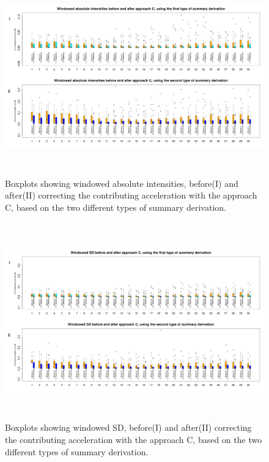 \documentclass{article}
\begin{document}
{\begin{figure}[h!]
\includegraphics[width=15cm, height=8.5cm]{result_approach_C_AI_boxplot.png}
\caption{Boxplots showing windowed absolute intensities, before(I) and after(II) correcting the contributing acceleration with the approach C, based on the two different types of summary derivation.}
\end{figure}
\newpage
\begin{figure}[h!]
\includegraphics[width=15cm, height=8.5cm]{result_approach_C_SD_boxplot.png}
\caption{Boxplots showing windowed SD, before(I) and after(II) correcting the contributing acceleration with the approach C, based on the two different types of summary derivation.}
\end{figure}

}
\end{document}
